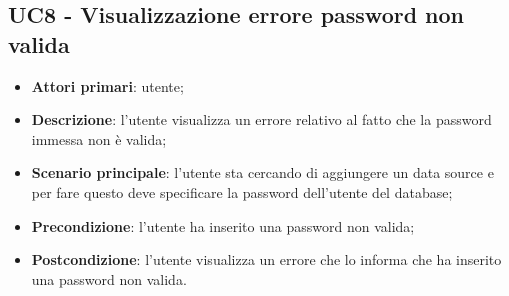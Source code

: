 \subsection{UC8 - Visualizzazione errore password non valida}
\begin{itemize}
	\item \textbf{Attori primari}: utente;
	\item \textbf{Descrizione}: l'utente visualizza un errore relativo al fatto che la password immessa non è valida;
	\item \textbf{Scenario principale}: l'utente sta cercando di aggiungere un data source e per fare questo deve specificare la password dell'utente del database;
	\item \textbf{Precondizione}: l'utente ha inserito una password non valida;
	\item \textbf{Postcondizione}: l'utente visualizza un errore che lo informa che ha inserito una password non valida.
\end{itemize}




